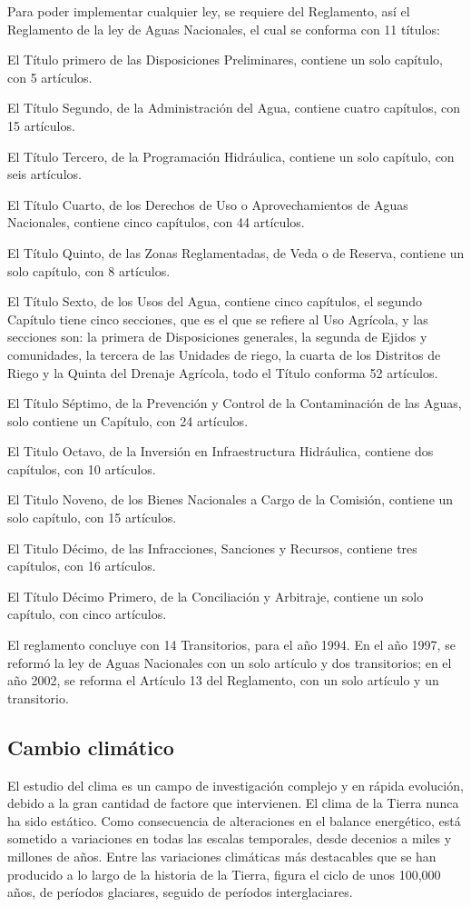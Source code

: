 Para poder implementar cualquier ley, se requiere del Reglamento, así el
Reglamento de la ley de Aguas Nacionales, el cual se conforma con 11 títulos:

El Título primero de las Disposiciones Preliminares, contiene un solo capítulo,
con 5 artículos.

El Título Segundo, de la Administración del Agua, contiene cuatro capítulos, con
15 artículos.

El Título Tercero, de la Programación Hidráulica, contiene un solo capítulo, con
seis artículos.

El Título Cuarto, de los Derechos de Uso o Aprovechamientos de Aguas
Nacionales, contiene cinco capítulos, con 44 artículos.

El Título Quinto, de las Zonas Reglamentadas, de Veda o de Reserva, contiene
un solo capítulo, con 8 artículos.

El Título Sexto, de los Usos del Agua, contiene cinco capítulos, el segundo
Capítulo tiene cinco secciones, que es el que se refiere al Uso Agrícola, y las secciones
son: la primera de Disposiciones generales, la segunda de Ejidos y comunidades, la
tercera de las Unidades de riego, la cuarta de los Distritos de Riego y la Quinta del
Drenaje Agrícola, todo el Título conforma 52 artículos.

El Título Séptimo, de la Prevención y Control de la Contaminación de las Aguas,
solo contiene un Capítulo, con 24 artículos.

El Titulo Octavo, de la Inversión en Infraestructura Hidráulica, contiene dos
capítulos, con 10 artículos.

El Titulo Noveno, de los Bienes Nacionales a Cargo de la Comisión, contiene un
solo capítulo, con 15 artículos.

El Titulo Décimo, de las Infracciones, Sanciones y Recursos, contiene tres
capítulos, con 16 artículos.

El Título Décimo Primero, de la Conciliación y Arbitraje, contiene un solo capítulo,
con cinco artículos.

El reglamento concluye con 14 Transitorios, para el año 1994. En el año 1997, se
reformó la ley de Aguas Nacionales con un solo artículo y dos transitorios; en el año
2002, se reforma el Artículo 13 del Reglamento, con un solo artículo y un transitorio.

\subsection{Cambio climático}
El estudio del clima es un campo de investigación complejo y en rápida evolución,
debido a la gran cantidad de factore que intervienen. El clima de la Tierra nunca ha
sido estático. Como consecuencia de alteraciones en el balance energético, está
sometido a variaciones en todas las escalas temporales, desde decenios a miles y
millones de años. Entre las variaciones climáticas más destacables que se han
producido a lo largo de la historia de la Tierra, figura el ciclo de unos 100,000 años, de
períodos glaciares, seguido de períodos interglaciares.

